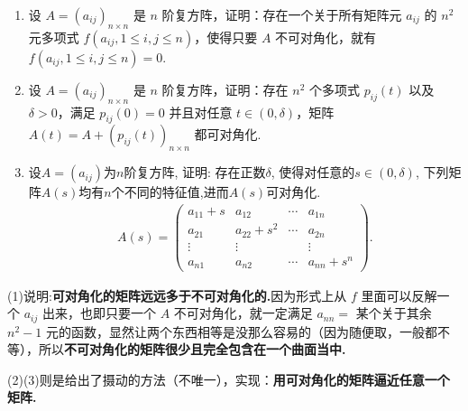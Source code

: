 \documentclass[../../main.tex]{subfiles}%
\begin{document}
\begin{proposition}[不可对角化矩阵的摄动]\label{proposition:不可对角化矩阵的摄动}
\begin{enumerate}[(1)]
\item 设 $A = (a_{ij})_{n\times n}$ 是 $n$ 阶复方阵，证明：存在一个关于所有矩阵元 $a_{ij}$ 的 $n^2$ 元多项式 $f(a_{ij}, 1\leqslant  i, j\leqslant  n)$，使得只要 $A$ 不可对角化，就有 $f(a_{ij}, 1\leqslant  i, j\leqslant  n)=0$.

\item 设 $A = (a_{ij})_{n\times n}$ 是 $n$ 阶复方阵，证明：存在 $n^2$ 个多项式 $p_{ij}(t)$ 以及 $\delta > 0$，满足 $p_{ij}(0)=0$ 并且对任意 $t\in(0, \delta)$，矩阵 $A(t)=A + (p_{ij}(t))_{n\times n}$ 都可对角化. 

\item 设\(A = (a_{ij})\)为\(n\)阶复方阵, 证明: 存在正数\(\delta\), 使得对任意的\(s \in (0,\delta)\), 下列矩阵$A(s)$均有\(n\)个不同的特征值,进而$A(s)$可对角化.
\begin{align*}
A(s)= 
\begin{pmatrix}
a_{11}+s & a_{12} & \cdots & a_{1n}\\
a_{21} & a_{22}+s^{2} & \cdots & a_{2n}\\
\vdots & \vdots & & \vdots\\
a_{n1} & a_{n2} & \cdots & a_{nn}+s^{n}
\end{pmatrix}.
\end{align*}
\end{enumerate}
\end{proposition}
\begin{remark}
(1)说明:\textbf{可对角化的矩阵远远多于不可对角化的.}因为形式上从 $f$ 里面可以反解一个 $a_{ij}$ 出来，也即只要一个 $A$ 不可对角化，就一定满足 $a_{nn} =$ 某个关于其余 $n^2 - 1$ 元的函数，显然让两个东西相等是没那么容易的（因为随便取，一般都不等），所以\textbf{不可对角化的矩阵很少且完全包含在一个曲面当中.}

(2)(3)则是给出了摄动的方法（不唯一），实现：\textbf{用可对角化的矩阵逼近任意一个矩阵.} 
\end{remark}
\end{document}
